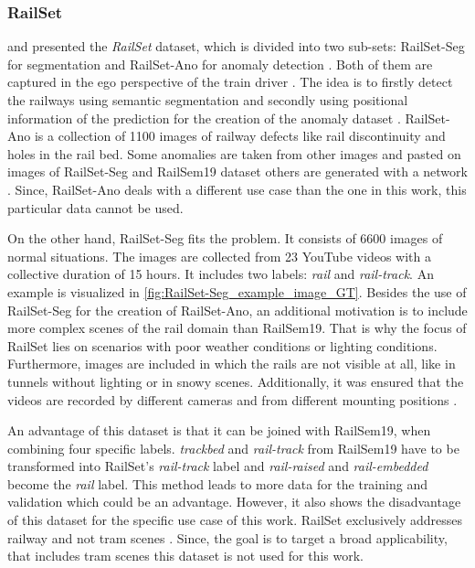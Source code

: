 \subsubsection{RailSet}
\label{subsubsec:RailSet}
\cite{railSet2022} and \cite{hadded2022application} presented the \textit{RailSet} dataset,
which is divided into two sub-sets: RailSet-Seg for segmentation and RailSet-Ano for anomaly detection \cite{railSet2022}.
Both of them are captured in the ego perspective of the train driver \cite{railSet2022} \cite{hadded2022application}.
The idea is to firstly detect the railways using semantic segmentation and secondly using positional information of the prediction for the creation of the anomaly dataset \cite{railSet2022}.
RailSet-Ano is a collection of 1100 images of railway defects like rail discontinuity and holes in the rail bed.
Some anomalies are taken from other images and pasted on images of RailSet-Seg and RailSem19 dataset others are generated with a network \cite{railSet2022}.
Since, RailSet-Ano deals with a different use case than the one in this work, this particular data cannot be used.

On the other hand, RailSet-Seg fits the problem. It consists of 6600 images of normal situations.
The images are collected from 23 YouTube videos with a collective duration of 15 hours. It includes two labels: \textit{rail} and \textit{rail-track}. An example is visualized in \autoref{fig:RailSet-Seg_example_image_GT}.
Besides the use of  RailSet-Seg for the creation of RailSet-Ano, an additional motivation is to include more complex scenes of the rail domain than RailSem19.
That is why the focus of RailSet lies on scenarios with poor weather conditions or lighting conditions.
Furthermore, images are included in which the rails are not visible at all, like in tunnels without lighting or in snowy scenes.
Additionally, it was ensured that the videos are recorded by different cameras and from different mounting positions \cite{railSet2022} \cite{hadded2022application}. 

An advantage of this dataset is that it can be joined with RailSem19, when combining four specific labels.
\textit{trackbed} and \textit{rail-track} from RailSem19 have to be transformed into RailSet's \textit{rail-track} label and \textit{rail-raised} and \textit{rail-embedded} become the \textit{rail} label.
This method leads to more data for the training and validation which could be an advantage.
However, it also shows the disadvantage of this dataset for the specific use case of this work.
RailSet exclusively addresses railway and not tram scenes \cite{hadded2022application}.
Since, the goal is to target a broad applicability, that includes tram scenes this dataset is not used for this work.

